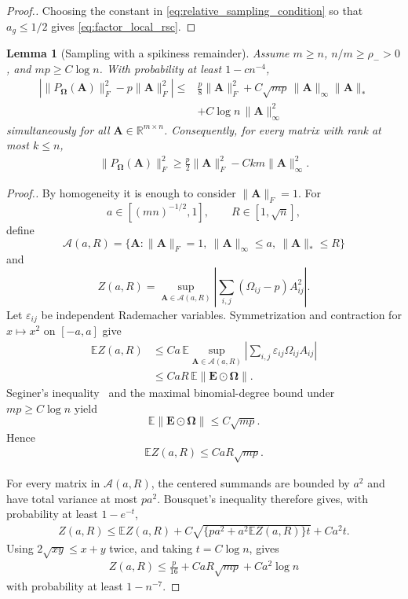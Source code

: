 \documentclass[numsec,webpdf,modern,large,namedate]{oup-authoring-template}
\theoremstyle{plain}
\newtheorem{slemma}{Lemma}%
\theoremstyle{remark}
\newcommand{\bOmega}{\bm{\Omega}}
\newif\ifmarkchanges
\newenvironment{revision}{\begingroup\ifmarkchanges\color{red}\fi}{\endgroup}
\begin{document}
\begin{revision}
\begin{proof}[Proof.]
Choosing the constant in \eqref{eq:relative_sampling_condition} so that $a_g\le1/2$ gives \eqref{eq:factor_local_rsc}.
\end{proof}

\begin{slemma}[Sampling with a spikiness remainder]
\label{lem:coarse_sampling_rsc}\label{lem:nuclear_effective_rsc}
Assume $m\ge n$, $n/m\ge\rho_->0$, and $mp\ge C\log n$.  With probability
at least $1-cn^{-4}$,
\begin{align}
\label{eq:nuclear_effective_rsc}
 \left|
 \|P_{\bOmega}(\bm A)\|_F^2
 -
 p\|\bm A\|_F^2
 \right|
 \le&
 \frac p8\|\bm A\|_F^2
 +
 C\sqrt{mp}\,
 \|\bm A\|_\infty\|\bm A\|_*
 \nonumber\\
 &+
 C\log n\,\|\bm A\|_\infty^2
\end{align}
simultaneously for all
$\bm A\in\mathbb R^{m\times n}$.
Consequently, for every matrix with rank at most $k\le n$,
\begin{align}
 \|P_{\bOmega}(\bm A)\|_F^2
 \ge\frac p2\|\bm A\|_F^2-Ckm\|\bm A\|_\infty^2.
 \label{eq:coarse_rsc}
\end{align}
\end{slemma}
\begin{proof}[Proof.]
By homogeneity it is enough to consider $\|\bm A\|_F=1$.
For
\[
a\in[(mn)^{-1/2},1],
\qquad
R\in[1,\sqrt n],
\]
define
\[
 \mathcal A(a,R)
 =
 \{
 \bm A:
 \|\bm A\|_F=1,\
 \|\bm A\|_\infty\le a,\
 \|\bm A\|_*\le R
 \}
\]
and
\[
 Z(a,R)
 =
 \sup_{\bm A\in\mathcal A(a,R)}
 \left|
 \sum_{i,j}
 (\Omega_{ij}-p)A_{ij}^2
 \right|.
\]
Let $\varepsilon_{ij}$ be independent Rademacher variables.  Symmetrization
and contraction for $x\mapsto x^2$ on $[-a,a]$ give
\begin{align*}
 \mathbb EZ(a,R)
 &\le
 Ca\,
 \mathbb E
 \sup_{\bm A\in\mathcal A(a,R)}
 \left|
 \sum_{i,j}
 \varepsilon_{ij}\Omega_{ij}A_{ij}
 \right|\\
 &\le
 CaR\,
 \mathbb E\|\bm E\odot\bOmega\|.
\end{align*}
Seginer's inequality~\citep{seginer2000expected} and the maximal
binomial-degree bound under $mp\ge C\log n$ yield
\[
 \mathbb E\|\bm E\odot\bOmega\|
 \le
 C\sqrt{mp}.
\]
Hence
\begin{align}
\label{eq:nuclear_effective_rsc_expectation}
 \mathbb EZ(a,R)
 \le
 CaR\sqrt{mp}.
\end{align}

For every matrix in $\mathcal A(a,R)$, the centered summands are bounded by
$a^2$ and have total variance at most $pa^2$.  Bousquet's inequality
therefore gives, with probability at least $1-e^{-t}$,
\begin{align*}
 Z(a,R)
 \le
 \mathbb EZ(a,R)
 +
 C\sqrt{
 \{pa^2+a^2\mathbb EZ(a,R)\}t
 }
 +
 Ca^2t.
\end{align*}
Using
$2\sqrt{xy}\le x+y$
twice, and taking $t=C\log n$, gives
\begin{align}
\label{eq:nuclear_effective_rsc_shell}
 Z(a,R)
 \le
 \frac p{16}
 +
 CaR\sqrt{mp}
 +
 Ca^2\log n
\end{align}
with probability at least $1-n^{-7}$.


\end{proof}
\end{revision}
\end{document}

